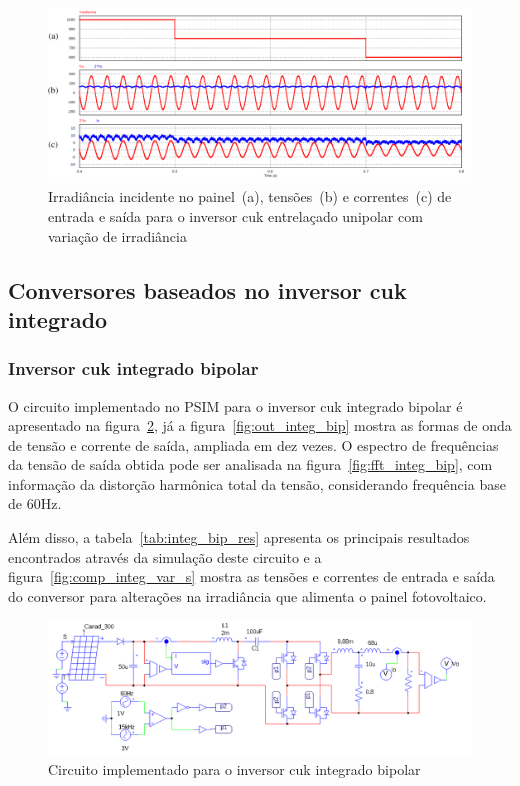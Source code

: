 \documentclass[
	12pt,				%
	openright,			%
	twoside,			%
	a4paper,			%
	english,			%
	french,				%
	spanish,			%
	brazil,				%
	]{abntex2}
\begin{document}
\begin{figure}[H]%
	\captionsetup{justification=centering}
	\centering
		\includegraphics[width= \linewidth]{comp_interv_var_s_unip}
		\caption{Irradiância incidente no painel~(a), tensões~(b) e correntes~(c) de entrada e saída para o inversor cuk entrelaçado unipolar com variação de irradiância}
		\label{fig:comp_interv_var_s_unip}
\end{figure}

\subsection{Conversores baseados no inversor cuk integrado}

\subsubsection{Inversor cuk integrado bipolar}

O circuito implementado no PSIM para o inversor cuk integrado bipolar é apresentado na figura~\ref{fig:comp_integ_circ_clean}, já a figura~\ref{fig:out_integ_bip} mostra as formas de onda de tensão e corrente de saída, ampliada em dez vezes. O espectro de frequências da tensão de saída obtida pode ser analisada na figura~\ref{fig:fft_integ_bip},  com informação da distorção harmônica total da tensão, considerando frequência base de 60Hz.

Além disso, a tabela~\ref{tab:integ_bip_res} apresenta os principais resultados encontrados através da simulação deste circuito e a figura~\ref{fig:comp_integ_var_s} mostra as tensões e correntes de entrada e saída do conversor para alterações na irradiância que alimenta o painel fotovoltaico.

\begin{figure}[H]%
	\captionsetup{justification=centering}
	\centering
		\includegraphics[width= \linewidth]{comp_integ_circ_clean}
		\caption{Circuito implementado para o inversor cuk integrado bipolar}
		\label{fig:comp_integ_circ_clean}
\end{figure}
\end{document}
